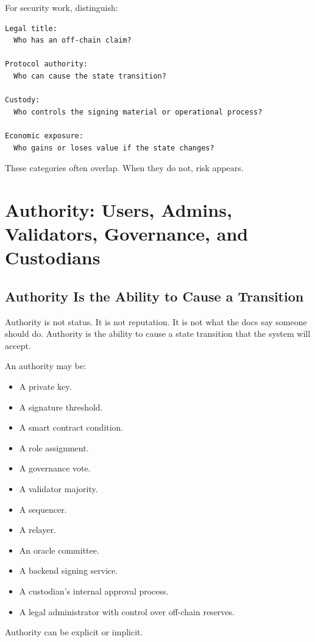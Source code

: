 For security work, distinguish:

\begin{lstlisting}
Legal title:
  Who has an off-chain claim?

Protocol authority:
  Who can cause the state transition?

Custody:
  Who controls the signing material or operational process?

Economic exposure:
  Who gains or loses value if the state changes?
\end{lstlisting}

These categories often overlap. When they do not, risk appears.

\section{Authority: Users, Admins, Validators, Governance, and Custodians}

\subsection{Authority Is the Ability to Cause a Transition}

Authority is not status. It is not reputation. It is not what the docs
say someone should do. Authority is the ability to cause a state
transition that the system will accept.

An authority may be:

\begin{itemize}
\tightlist
\item
  A private key.
\item
  A signature threshold.
\item
  A smart contract condition.
\item
  A role assignment.
\item
  A governance vote.
\item
  A validator majority.
\item
  A sequencer.
\item
  A relayer.
\item
  An oracle committee.
\item
  A backend signing service.
\item
  A custodian's internal approval process.
\item
  A legal administrator with control over off-chain reserves.
\end{itemize}

Authority can be explicit or implicit.

